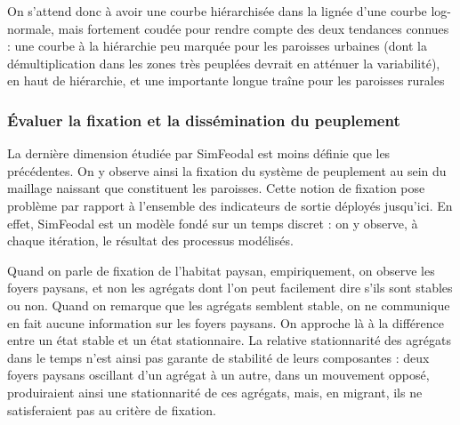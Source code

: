 On s'attend donc à avoir une courbe hiérarchisée dans la lignée d'une courbe log-normale, mais fortement \og coudée\fg{} pour rendre compte des deux tendances connues : une courbe à la hiérarchie peu marquée pour les paroisses urbaines (dont la démultiplication dans les zones très peuplées devrait en atténuer la variabilité), en haut de hiérarchie, et une importante \og longue traîne\fg{} pour les paroisses \og rurales\fg{}
%


\subsubsection{Évaluer la fixation et la dissémination du peuplement}

La dernière dimension étudiée par SimFeodal est moins définie que les précédentes.
On y observe ainsi la fixation du système de peuplement au sein du maillage naissant que constituent les paroisses.
Cette notion de fixation pose problème par rapport à l'ensemble des indicateurs de sortie déployés jusqu'ici.
En effet, SimFeodal est un modèle fondé sur un temps discret :
on y observe, à chaque itération, le résultat des processus modélisés.

Quand on parle de fixation de l'habitat paysan, empiriquement, on observe les foyers paysans, et non les agrégats dont l'on peut facilement dire s'ils sont stables ou non.
Quand on remarque que les agrégats semblent stable, on ne communique en fait aucune information sur les foyers paysans.
On approche là à la différence entre un état stable et un état stationnaire.
La relative stationnarité des agrégats dans le temps n'est ainsi pas garante de stabilité de leurs composantes :
deux foyers paysans oscillant d'un agrégat à un autre, dans un mouvement opposé, produiraient ainsi une stationnarité de ces agrégats, mais, en migrant, ils ne satisferaient pas au critère de fixation.

